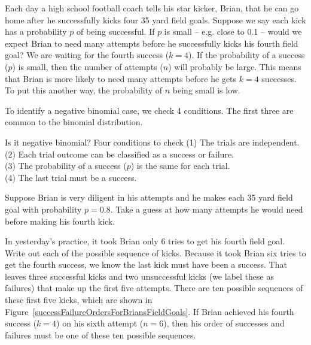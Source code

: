\begin{examplewrap}
\begin{nexample}{Each day a high school football coach tells his star kicker, Brian, that he can go home after he successfully kicks four 35 yard field goals. Suppose we say each kick has a probability $p$ of being successful. If $p$ is small -- e.g. close to 0.1 -- would we expect Brian to need many attempts before he successfully kicks his fourth field goal?}
We are waiting for the fourth success ($k=4$). If the probability of a success ($p$) is small, then the number of attempts ($n$) will probably be large. This means that Brian is more likely to need many attempts before he gets $k=4$ successes. To put this another way, the probability of $n$ being small is low.
\end{nexample}
\end{examplewrap}

To identify a negative binomial case, we check 4 conditions. The first three are common to the binomial distribution.

\begin{onebox}{Is it negative binomial? Four conditions to check}
(1) The trials are independent. \\
(2) Each trial outcome can be classified as a success or failure. \\
(3) The probability of a success ($p$) is the same for each trial. \\
(4) The last trial must be a success.
\end{onebox}

\begin{exercisewrap}
\begin{nexercise}
Suppose Brian is very diligent in his attempts and he makes each 35 yard field goal with probability $p=0.8$. Take a guess at how many attempts he would need before making his fourth kick.\footnotemark
\end{nexercise}
\end{exercisewrap}

\begin{examplewrap}
\begin{nexample}{In yesterday's practice, it took Brian only 6 tries to get his fourth field goal. Write out each of the possible sequence of kicks.} \label{eachSeqOfSixTriesToGetFourSuccesses}
Because it took Brian six tries to get the fourth success, we know the last kick must have been a success. That leaves three successful kicks and two unsuccessful kicks (we label these as failures) that make up the first five attempts. There are ten possible sequences of these first five kicks, which are shown in Figure~\ref{successFailureOrdersForBriansFieldGoals}. If Brian achieved his fourth success ($k=4$) on his sixth attempt ($n=6$), then his order of successes and failures must be one of these ten possible sequences.
\end{nexample}
\end{examplewrap}

